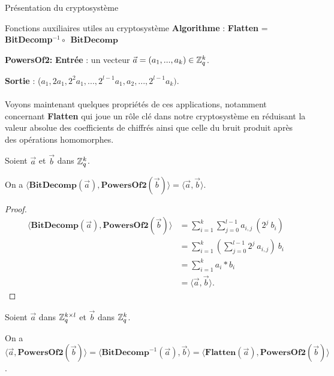 \begin{section}{Présentation du cryptosystème}
\begin{subsection}{Fonctions auxiliaires utiles au cryptosystème}
	\textbf{Algorithme} : \textbf{Flatten} = \textbf{BitDecomp}$^{-1} \circ\:\: \textbf{BitDecomp}$  

\begin{samepage} %

\vspace{0.5cm}\noindent\textbf{PowersOf2:}
\flushleft
	\textbf{Entrée} : un vecteur $\vec{a} = (a_1, ..., a_k) \in \mathbb{Z}_q^{k}$.

	\textbf{Sortie} : ($a_1, 2 a_1, 2^{2} a_1, ..., 2^{l-1} a_1, a_2, ..., 2^{l-1} a_k)$.
\end{samepage}	
	
	\paragraph{}
	Voyons maintenant quelques propriétés de ces applications, notamment concernant \textbf{Flatten} qui joue un
	rôle clé dans notre cryptosystème en réduisant la valeur absolue des coefficients de chiffrés ainsi que celle du
	bruit produit après des opérations homomorphes.
	\begin{prop}
	Soient $\vec{a}$ et $\vec{b}$ dans $\mathbb{Z}_q^{k}$.

	On a $\langle \textbf{BitDecomp}(\vec{a}), \textbf{PowersOf2}(\vec{b}) \rangle = \langle\vec{a},\vec{b} \rangle$.
	\end{prop}

	\begin{proof}
	\begin{align*}
	\langle \textbf{BitDecomp}(\vec{a}), \textbf{PowersOf2}(\vec{b}) \rangle &= \sum\limits_{i=1}^{k}
	\sum\limits_{j=0}^{l-1} a_{i,j} \:(2^{j} \:b_i) \\
	&= \sum\limits_{i=1}^{k} \left(\sum\limits_{j=0}^{l-1} 2^j \:a_{i,j} \right) \: b_i \\ 
	&= \sum\limits_{i=1}^{k} a_i * b_i \\
	&= \langle\vec{a},\vec{b} \rangle.
	\end{align*}
	\end{proof}
	
	\begin{prop} \label{flatten}
	Soient $\vec{a}$ dans $\mathbb{Z}_q^{k \times l}$ et $\vec{b}$ dans $\mathbb{Z}_q^{k}$.

	On a $\langle \vec{a}, \textbf{PowersOf2}(\vec{b}) \rangle = \langle \textbf{BitDecomp}^{-1}(\vec{a}), \vec{b}\rangle = \langle \textbf{Flatten}(\vec{a}),\textbf{PowersOf2}(\vec{b}) \rangle$.
	\end{prop}


\end{subsection}
\end{section}
